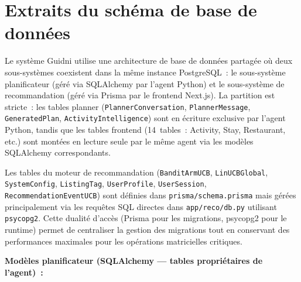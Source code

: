 \section{Extraits du schéma de base de données}
\label{ann:schema}

Le système Guidni utilise une architecture de base de données partagée où deux sous-systèmes
coexistent dans la même instance PostgreSQL~: le sous-système planificateur (géré via
SQLAlchemy par l'agent Python) et le sous-système de recommandation (géré via Prisma par le
frontend Next.js). La partition est stricte~: les tables planner (\texttt{PlannerConversation},
\texttt{PlannerMessage}, \texttt{GeneratedPlan}, \texttt{ActivityIntelligence}) sont en
écriture exclusive par l'agent Python, tandis que les tables frontend (14~tables~: Activity,
Stay, Restaurant, etc.) sont montées en lecture seule par le même agent via les modèles
SQLAlchemy correspondants.

Les tables du moteur de recommandation (\texttt{BanditArmUCB}, \texttt{LinUCBGlobal},
\texttt{SystemConfig}, \texttt{ListingTag}, \texttt{UserProfile}, \texttt{UserSession},
\texttt{RecommendationEventUCB}) sont définies dans \texttt{prisma/schema.prisma} mais gérées
principalement via les requêtes SQL directes dans \texttt{app/reco/db.py} utilisant
\texttt{psycopg2}. Cette dualité d'accès (Prisma pour les migrations, psycopg2 pour le
runtime) permet de centraliser la gestion des migrations tout en conservant des performances
maximales pour les opérations matricielles critiques.

\textbf{Modèles planificateur (SQLAlchemy — tables propriétaires de l'agent)~:}

